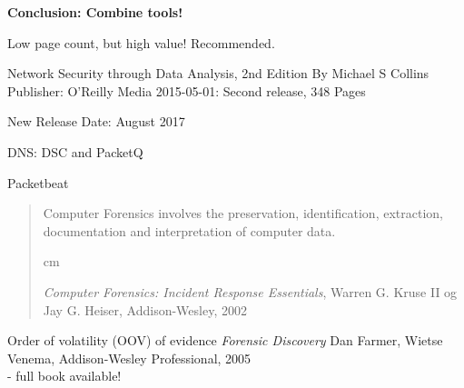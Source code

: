 \documentclass[Screen16to9,17pt]{foils}
\begin{document}
\vskip 2cm
\centerline{\bf\Large Conclusion: Combine tools!}




Low page count, but high value! Recommended.

Network Security through Data Analysis, 2nd Edition
By Michael S Collins
Publisher: O'Reilly Media
2015-05-01: Second release, 348 Pages

New Release Date: August 2017



\begin{list2}
\item DNS: DSC and PacketQ 
\item Packetbeat 

\item {}
\item {}
\end{list2}




\vskip 4cm

\begin{quote}
{\hlkbig
Computer Forensics involves the preservation, identification,
extraction, documentation and interpretation of computer data.}

 cm

\emph{Computer Forensics: Incident Response Essentials}, Warren
G. Kruse II og Jay G. Heiser, Addison-Wesley, 2002
\end{quote}







\begin{list1}
\item Order of volatility (OOV) of evidence
\emph{Forensic Discovery} Dan Farmer, Wietse Venema,  Addison-Wesley Professional, 2005\\
 - full book available!

\end{list1}
\end{document}
